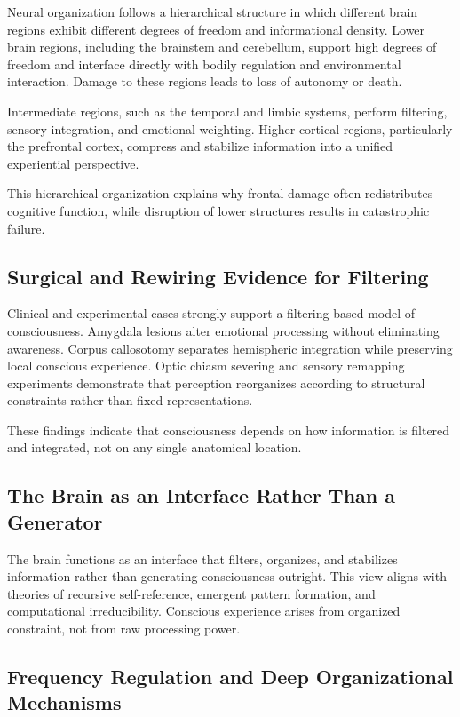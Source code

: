 \documentclass[12pt,letterpaper]{article}
\begin{document}
Neural organization follows a hierarchical structure in which different brain regions exhibit different degrees of freedom and informational density. Lower brain regions, including the brainstem and cerebellum, support high degrees of freedom and interface directly with bodily regulation and environmental interaction. Damage to these regions leads to loss of autonomy or death.

Intermediate regions, such as the temporal and limbic systems, perform filtering, sensory integration, and emotional weighting. Higher cortical regions, particularly the prefrontal cortex, compress and stabilize information into a unified experiential perspective.

This hierarchical organization explains why frontal damage often redistributes cognitive function, while disruption of lower structures results in catastrophic failure.

\subsection{Surgical and Rewiring Evidence for Filtering}

Clinical and experimental cases strongly support a filtering-based model of consciousness. Amygdala lesions alter emotional processing without eliminating awareness. Corpus callosotomy separates hemispheric integration while preserving local conscious experience. Optic chiasm severing and sensory remapping experiments demonstrate that perception reorganizes according to structural constraints rather than fixed representations.

These findings indicate that consciousness depends on how information is filtered and integrated, not on any single anatomical location.

\subsection{The Brain as an Interface Rather Than a Generator}

The brain functions as an interface that filters, organizes, and stabilizes information rather than generating consciousness outright. This view aligns with theories of recursive self-reference, emergent pattern formation, and computational irreducibility. Conscious experience arises from organized constraint, not from raw processing power.

\subsection{Frequency Regulation and Deep Organizational Mechanisms}
\end{document}
